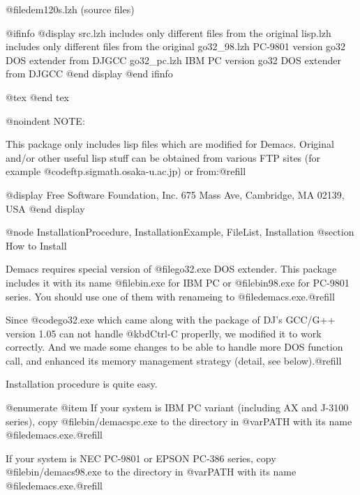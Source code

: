 @file{dem120s.lzh}  (source files)

@ifinfo
@display
src\diffs.lzh       includes only different files from the original
lisp\diffs.lzh      includes only different files from the original 
go32_98\source.lzh  PC-9801 version go32 DOS extender from DJGCC 
go32_pc\source.lzh  IBM PC version go32 DOS extender from DJGCC    
@end display
@end ifinfo

@tex
{}
@end tex

@noindent
NOTE: 

This package only includes lisp files which are modified for Demacs.
Original and/or other useful lisp stuff can be obtained from various FTP
sites (for example @code{ftp.sigmath.osaka-u.ac.jp}) or from:@refill

@display
Free Software Foundation, Inc.
675 Mass Ave, Cambridge, MA 02139, USA
@end display


@node InstallationProcedure, InstallationExample, FileList, Installation
@section How to Install

Demacs requires special version of @file{go32.exe} DOS extender. This
package includes it with its name @file{bin\demacspc.exe} for IBM PC or
@file{bin\demacs98.exe} for PC-9801 series. You should use one of them
with renameing to @file{demacs.exe}.@refill

Since @code{go32.exe} which came along with the package of DJ's GCC/G++
version 1.05 can not handle @kbd{Ctrl-C} properlly, we modified it to
work correctly. And we made some changes to be able to handle more DOS
function call, and enhanced its memory management strategy (detail, see
below).@refill

Installation procedure is quite easy. 

@enumerate
@item
If your system is IBM PC variant (including AX and J-3100 series), copy
@file{bin/demacspc.exe} to the directory in @var{PATH} with its name
@file{demacs.exe}.@refill

If your system is NEC PC-9801 or EPSON PC-386 series, copy
@file{bin/demacs98.exe} to the directory in @var{PATH} with its name
@file{demacs.exe}.@refill

